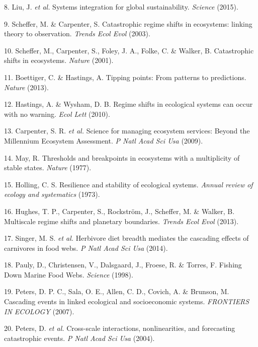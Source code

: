 \documentclass[9pt,]{article}
\begin{document}
\hypertarget{ref-Liu:2015go}{}
8. Liu, J. \emph{et al.} Systems integration for global sustainability.
\emph{Science} (2015).

\hypertarget{ref-Scheffer:2003p339}{}
9. Scheffer, M. \& Carpenter, S. Catastrophic regime shifts in
ecosystems: linking theory to observation. \emph{Trends Ecol Evol}
(2003).

\hypertarget{ref-Scheffer:2001uu}{}
10. Scheffer, M., Carpenter, S., Foley, J. A., Folke, C. \& Walker, B.
Catastrophic shifts in ecosystems. \emph{Nature} (2001).

\hypertarget{ref-Boettiger:2013bm}{}
11. Boettiger, C. \& Hastings, A. Tipping points: From patterns to
predictions. \emph{Nature} (2013).

\hypertarget{ref-Hastings:2010p5336}{}
12. Hastings, A. \& Wysham, D. B. Regime shifts in ecological systems
can occur with no warning. \emph{Ecol Lett} (2010).

\hypertarget{ref-Carpenter:2009jr}{}
13. Carpenter, S. R. \emph{et al.} Science for managing ecosystem
services: Beyond the Millennium Ecosystem Assessment. \emph{P Natl Acad
Sci Usa} (2009).

\hypertarget{ref-MAY:1977p3426}{}
14. May, R. Thresholds and breakpoints in ecosystems with a multiplicity
of stable states. \emph{Nature} (1977).

\hypertarget{ref-Holling:1973p6861}{}
15. Holling, C. S. Resilience and stability of ecological systems.
\emph{Annual review of ecology and systematics} (1973).

\hypertarget{ref-Hughes:2013cv}{}
16. Hughes, T. P., Carpenter, S., Rockström, J., Scheffer, M. \& Walker,
B. Multiscale regime shifts and planetary boundaries. \emph{Trends Ecol
Evol} (2013).

\hypertarget{ref-Singer:2014gj}{}
17. Singer, M. S. \emph{et al.} Herbivore diet breadth mediates the
cascading effects of carnivores in food webs. \emph{P Natl Acad Sci Usa}
(2014).

\hypertarget{ref-Pauly:1998iw}{}
18. Pauly, D., Christensen, V., Dalsgaard, J., Froese, R. \& Torres, F.
Fishing Down Marine Food Webs. \emph{Science} (1998).

\hypertarget{ref-Anonymous:2007tc}{}
19. Peters, D. P. C., Sala, O. E., Allen, C. D., Covich, A. \& Brunson,
M. Cascading events in linked ecological and socioeconomic systems.
\emph{FRONTIERS IN ECOLOGY} (2007).

\hypertarget{ref-DebraPCPeters:2004ex}{}
20. Peters, D. \emph{et al.} Cross-scale interactions, nonlinearities,
and forecasting catastrophic events. \emph{P Natl Acad Sci Usa} (2004).
\end{document}
